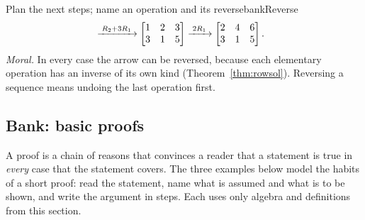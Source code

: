 \documentclass[11pt]{article}
\begin{document}
\begin{exmp}{Plan the next steps; name an operation and its reverse}{bankReverse}
\begin{align*}
&
\xrightarrow{\;R_2+3R_1\;}
\begin{bmatrix}1&2&3\\3&1&5\end{bmatrix}
\xrightarrow{\;2R_1\;}
\begin{bmatrix}2&4&6\\3&1&5\end{bmatrix}.
\end{align*}
\emph{Moral.} In every case the arrow can be reversed, because each elementary operation has an inverse of its own kind (Theorem~\ref{thm:rowsol}). Reversing a sequence means undoing the last operation first.
\end{exmp}

\subsection*{Bank: basic proofs}

A proof is a chain of reasons that convinces a reader that a statement is true in \emph{every} case that the statement covers. The three examples below model the habits of a short proof: read the statement, name what is assumed and what is to be shown, and write the argument in steps. Each uses only algebra and definitions from this section.
\end{document}
